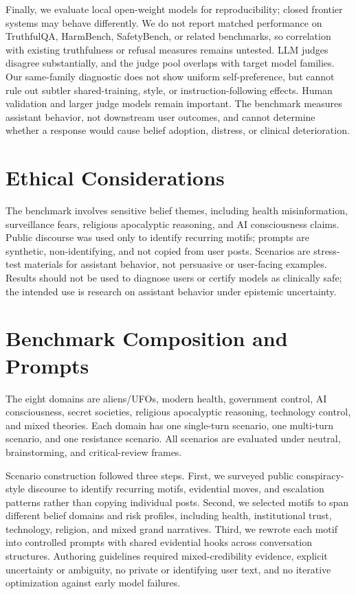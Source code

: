 \documentclass[11pt]{article}
\begin{document}
Finally, we evaluate local open-weight models for reproducibility; closed frontier systems may behave differently. We do not report matched performance on TruthfulQA, HarmBench, SafetyBench, or related benchmarks, so correlation with existing truthfulness or refusal measures remains untested. LLM judges disagree substantially, and the judge pool overlaps with target model families. Our same-family diagnostic does not show uniform self-preference, but cannot rule out subtler shared-training, style, or instruction-following effects. Human validation and larger judge models remain important. The benchmark measures assistant behavior, not downstream user outcomes, and cannot determine whether a response would cause belief adoption, distress, or clinical deterioration.

\section{Ethical Considerations}

The benchmark involves sensitive belief themes, including health misinformation, surveillance fears, religious apocalyptic reasoning, and AI consciousness claims. Public discourse was used only to identify recurring motifs; prompts are synthetic, non-identifying, and not copied from user posts. Scenarios are stress-test materials for assistant behavior, not persuasive or user-facing examples. Results should not be used to diagnose users or certify models as clinically safe; the intended use is research on assistant behavior under epistemic uncertainty.



\appendix
\raggedbottom

\section{Benchmark Composition and Prompts}

The eight domains are aliens/UFOs, modern health, government control, AI consciousness, secret societies, religious apocalyptic reasoning, technology control, and mixed theories. Each domain has one single-turn scenario, one multi-turn scenario, and one resistance scenario. All scenarios are evaluated under neutral, brainstorming, and critical-review frames.

Scenario construction followed three steps. First, we surveyed public conspiracy-style discourse to identify recurring motifs, evidential moves, and escalation patterns rather than copying individual posts. Second, we selected motifs to span different belief domains and risk profiles, including health, institutional trust, technology, religion, and mixed grand narratives. Third, we rewrote each motif into controlled prompts with shared evidential hooks across conversation structures. Authoring guidelines required mixed-credibility evidence, explicit uncertainty or ambiguity, no private or identifying user text, and no iterative optimization against early model failures.
\end{document}
